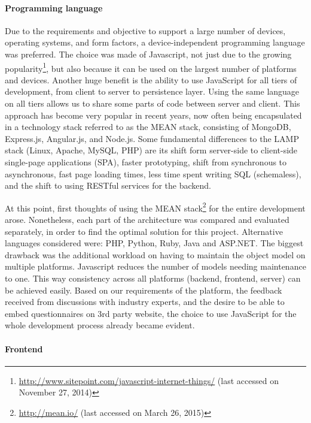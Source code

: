 	\paragraph{Programming language}

		Due to the requirements and objective to support a large number of devices, operating systems, and form factors, a device-independent programming language was preferred. 
		The choice was made of Javascript, not just due to the growing popularity\footnote{\url{http://www.sitepoint.com/javascript-internet-things/} (last accessed on November 27, 2014)}, but also because it can be used on the largest number of platforms and devices. Another huge benefit is the ability to use JavaScript for all tiers of development, from client to server to persistence layer. Using the same language on all tiers allows us to share some parts of code between server and client. This approach has become very popular in recent years, now often being encapsulated in a technology stack referred to as the MEAN stack, consisting of MongoDB, Express.js, Angular.js, and Node.js. Some fundamental differences to the LAMP stack (Linux, Apache, MySQL, PHP) are its shift form server-side to client-side single-page applications (SPA), faster prototyping, shift from synchronous to asynchronous, fast page loading times, less time spent writing SQL (schemaless), and the shift to using RESTful services for the backend. \cite{Scott2014MEANStack}

		At this point, first thoughts of using the MEAN stack\footnote{\url{http://mean.io/} (last accessed on March 26, 2015)} for the entire development arose. Nonetheless, each part of the architecture was compared and evaluated separately, in order to find the optimal solution for this project. Alternative languages considered were: PHP, Python, Ruby, Java and ASP.NET. The biggest drawback was the additional workload on having to maintain the object model on multiple platforms. Javascript reduces the number of models needing maintenance to one. This way consistency across all platforms (backend, frontend, server) can be achieved easily.
		Based on our requirements of the platform, the feedback received from discussions with industry experts, and the desire to be able to embed questionnaires on 3rd party website, the choice to use JavaScript for the whole development process already became evident. 


	\paragraph{Frontend}

